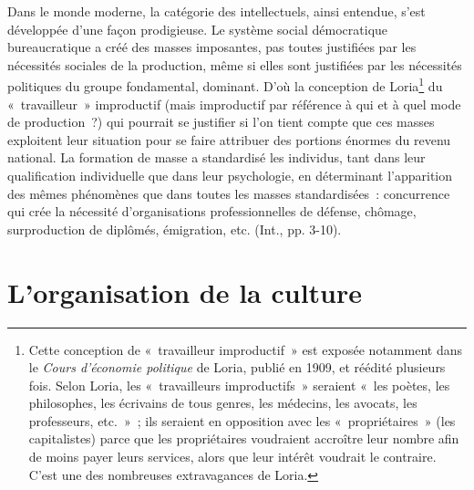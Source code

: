 \documentclass[french,twoside]{book} %
\newcommand\chapteropen{} %
\newcommand\chaptercont{} %
\newcommand\chapterclose{} %
\begin{document}
 Dans le monde moderne, la catégorie des intellectuels, ainsi entendue, s’est développée d’une façon prodigieuse. Le système social démocratique bureaucratique a créé des masses imposantes, pas toutes justifiées par les nécessités sociales de la production, même si elles sont justifiées par les nécessités politiques du groupe fondamental, dominant. D'où la conception de Loria\footnote{Cette conception de « travailleur improductif » est exposée notamment dans le \emph{Cours d’économie politique} de Loria, publié en 1909, et réédité plusieurs fois. Selon Loria, les « travailleurs improductifs » seraient « les poètes, les philosophes, les écrivains de tous genres, les médecins, les avocats, les professeurs, etc. » ; ils seraient en opposition avec les « propriétaires » (les capitalistes) parce que les propriétaires voudraient accroître leur nombre afin de moins payer leurs services, alors que leur intérêt voudrait le contraire. C'est une des nombreuses extravagances de Loria.} du « travailleur » improductif (mais improductif par référence à qui et à quel mode de production ?) qui pourrait se justifier si l’on tient compte que ces masses exploitent leur situation pour se faire attribuer des portions énormes du revenu national. La formation de masse a standardisé les individus, tant dans leur qualification individuelle que dans leur psychologie, en déterminant l’apparition des mêmes phénomènes que dans toutes les masses standardisées : concurrence qui crée la nécessité d’organisations professionnelles de défense, chômage, surproduction de diplômés, émigration, etc. (Int., pp. 3-10).\par
{\raggedleft \noindent [1930-1932]}
\chapterclose


\chapteropen
\chapter[{L'organisation de la culture}]{L'organisation de la culture}\renewcommand{\leftmark}{L'organisation de la culture}


\chaptercont
\end{document}
